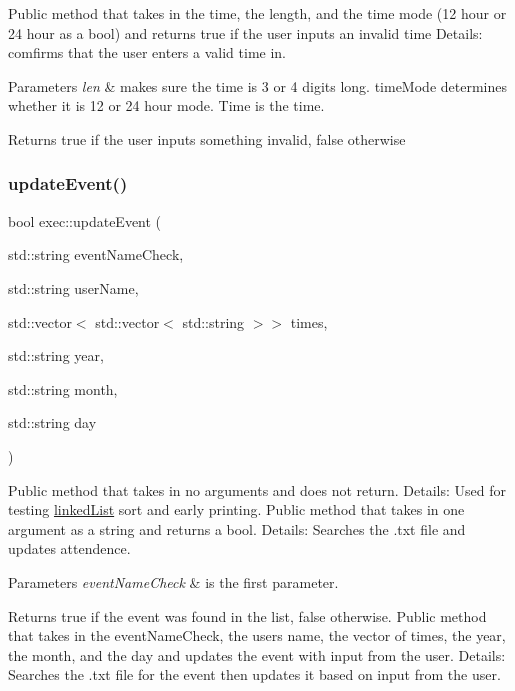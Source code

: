 Public method that takes in the time, the length, and the time mode (12 hour or 24 hour as a bool) and returns true if the user inputs an invalid time Details\+: comfirms that the user enters a valid time in. 
\begin{DoxyParams}{Parameters}
{\em len} & makes sure the time is 3 or 4 digits long. time\+Mode determines whether it is 12 or 24 hour mode. Time is the time. \\
\hline
\end{DoxyParams}
\begin{DoxyReturn}{Returns}
true if the user inputs something invalid, false otherwise 
\end{DoxyReturn}
\mbox{\label{classexec_a53711d45518e4b3b690db15f057c1452}} 
\subsubsection{\texorpdfstring{update\+Event()}{updateEvent()}}
{\footnotesize\ttfamily bool exec\+::update\+Event (\begin{DoxyParamCaption}\item[{std\+::string}]{event\+Name\+Check,  }\item[{std\+::string}]{user\+Name,  }\item[{std\+::vector$<$ std\+::vector$<$ std\+::string $>$$>$}]{times,  }\item[{std\+::string}]{year,  }\item[{std\+::string}]{month,  }\item[{std\+::string}]{day }\end{DoxyParamCaption})}

Public method that takes in no arguments and does not return. Details\+: Used for testing \hyperlink{classlinked_list}{linked\+List} sort and early printing. Public method that takes in one argument as a string and returns a bool. Details\+: Searches the .txt file and updates attendence. 
\begin{DoxyParams}{Parameters}
{\em event\+Name\+Check} & is the first parameter. \\
\hline
\end{DoxyParams}
\begin{DoxyReturn}{Returns}
true if the event was found in the list, false otherwise. Public method that takes in the event\+Name\+Check, the user\textquotesingle{}s name, the vector of times, the year, the month, and the day and updates the event with input from the user. Details\+: Searches the .txt file for the event then updates it based on input from the user. 
\end{DoxyReturn}


